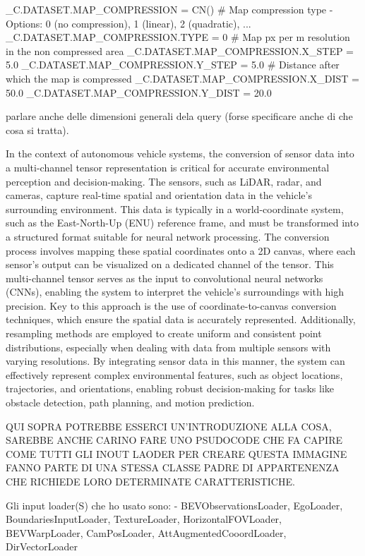 _C.DATASET.MAP_COMPRESSION = CN()
# Map compression type - Options: 0 (no compression), 1 (linear), 2 (quadratic), ...
_C.DATASET.MAP_COMPRESSION.TYPE = 0
# Map px per m resolution in the non compressed area
_C.DATASET.MAP_COMPRESSION.X_STEP = 5.0
_C.DATASET.MAP_COMPRESSION.Y_STEP = 5.0
# Distance after which the map is compressed
_C.DATASET.MAP_COMPRESSION.X_DIST = 50.0
_C.DATASET.MAP_COMPRESSION.Y_DIST = 20.0

parlare anche delle dimensioni generali dela query (forse specificare anche di che cosa si tratta).

In the context of autonomous vehicle systems, the conversion of sensor data into a multi-channel tensor representation is critical for accurate environmental perception and decision-making. The sensors, such as LiDAR, radar, and cameras, capture real-time spatial and orientation data in the vehicle’s surrounding environment. This data is typically in a world-coordinate system, such as the East-North-Up (ENU) reference frame, and must be transformed into a structured format suitable for neural network processing. The conversion process involves mapping these spatial coordinates onto a 2D canvas, where each sensor’s output can be visualized on a dedicated channel of the tensor. This multi-channel tensor serves as the input to convolutional neural networks (CNNs), enabling the system to interpret the vehicle's surroundings with high precision. Key to this approach is the use of coordinate-to-canvas conversion techniques, which ensure the spatial data is accurately represented. Additionally, resampling methods are employed to create uniform and consistent point distributions, especially when dealing with data from multiple sensors with varying resolutions. By integrating sensor data in this manner, the system can effectively represent complex environmental features, such as object locations, trajectories, and orientations, enabling robust decision-making for tasks like obstacle detection, path planning, and motion prediction.

QUI SOPRA POTREBBE ESSERCI UN'INTRODUZIONE ALLA COSA, SAREBBE ANCHE CARINO FARE UNO PSUDOCODE CHE FA CAPIRE COME TUTTI GLI INOUT LAODER PER CREARE QUESTA IMMAGINE FANNO PARTE DI UNA STESSA CLASSE PADRE DI APPARTENENZA CHE RICHIEDE LORO DETERMINATE CARATTERISTICHE. 

Gli input loader(S) che ho usato sono:
- BEVObservationsLoader, EgoLoader, BoundariesInputLoader, TextureLoader, HorizontalFOVLoader, BEVWarpLoader, CamPosLoader, AttAugmentedCooordLoader, DirVectorLoader

